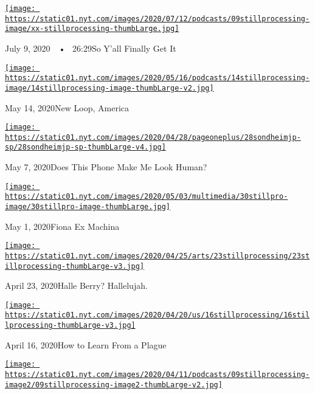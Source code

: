 \href{https://www.nytimes.com/2020/07/09/podcasts/still-processing-black-lives-matter.html?action=click\&module=audio-series-bar\&region=header\&pgtype=Article}{\texttt{[image: https://static01.nyt.com/images/2020/07/12/podcasts/09stillprocessing-image/xx-stillprocessing-thumbLarge.jpg]}}

July 9, 2020~~•~ 26:29So Y'all Finally Get It

\href{https://www.nytimes.com/2020/05/14/podcasts/still-processing-westworld-hollywood-utopia-dystopia.html?action=click\&module=audio-series-bar\&region=header\&pgtype=Article}{\texttt{[image: https://static01.nyt.com/images/2020/05/16/podcasts/14stillprocessing-image/14stillprocessing-image-thumbLarge-v2.jpg]}}

May 14, 2020New Loop, America

\href{https://www.nytimes.com/2020/05/07/podcasts/still-processing-internet-vulnerability-sondheim-parks-recreation.html?action=click\&module=audio-series-bar\&region=header\&pgtype=Article}{\texttt{[image: https://static01.nyt.com/images/2020/04/28/pageoneplus/28sondheimjp-sp/28sondheimjp-sp-thumbLarge-v4.jpg]}}

May 7, 2020Does This Phone Make Me Look Human?

\href{https://www.nytimes.com/2020/04/30/podcasts/still-processing-fiona-apple-fetch-bolt-cutters.html?action=click\&module=audio-series-bar\&region=header\&pgtype=Article}{\texttt{[image: https://static01.nyt.com/images/2020/05/03/multimedia/30stillpro-image/30stillpro-image-thumbLarge.jpg]}}

May 1, 2020Fiona Ex Machina

\href{https://www.nytimes.com/2020/04/23/podcasts/still-processing-halle-berry-sharon-stone-catwoman-quarantine.html?action=click\&module=audio-series-bar\&region=header\&pgtype=Article}{\texttt{[image: https://static01.nyt.com/images/2020/04/25/arts/23stillprocessing/23stillprocessing-thumbLarge-v3.jpg]}}

April 23, 2020Halle Berry? Hallelujah.

\href{https://www.nytimes.com/2020/04/16/podcasts/still-processing-AIDS-survive-coronavirus.html?action=click\&module=audio-series-bar\&region=header\&pgtype=Article}{\texttt{[image: https://static01.nyt.com/images/2020/04/20/us/16stillprocessing/16stillprocessing-thumbLarge-v3.jpg]}}

April 16, 2020How to Learn From a Plague

\href{https://www.nytimes.com/2020/04/09/podcasts/still-processing-tiger-king.html?action=click\&module=audio-series-bar\&region=header\&pgtype=Article}{\texttt{[image: https://static01.nyt.com/images/2020/04/11/podcasts/09stillprocessing-image2/09stillprocessing-image2-thumbLarge-v2.jpg]}}

